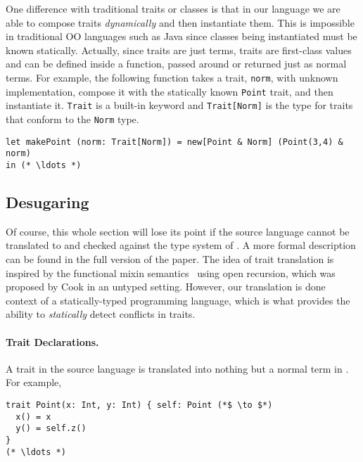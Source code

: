 One difference with traditional traits or classes is that in our language we are
able to compose traits \emph{dynamically} and then instantiate them. This is
impossible in traditional OO languages such as Java since classes being
instantiated must be known statically. Actually, since traits are just terms,
traits are first-class values and can be defined inside a function, passed
around or returned just as normal terms. For example, the following function
takes a trait, \lstinline$norm$, with unknown implementation, compose it with
the statically known \lstinline$Point$ trait, and then instantiate it.
\lstinline$Trait$ is a built-in keyword and \lstinline$Trait[Norm]$ is the type
for traits that conform to the \lstinline$Norm$ type.

\begin{lstlisting}
let makePoint (norm: Trait[Norm]) = new[Point & Norm] (Point(3,4) & norm)
in (* \ldots *)
\end{lstlisting}


\subsection{Desugaring}

Of course, this whole section will lose its point if the source language cannot
be translated to \name and checked against the type system of \name. A more
formal description can be found in the full version of the paper. The
idea of trait translation
is inspired by the functional mixin
semantics~\cite{cook1989denotational} using open recursion, which was
proposed by Cook in an untyped setting. However, our translation is done context of a
statically-typed programming language, which is what provides the ability to \emph{statically}
detect conflicts in traits.

\paragraph{Trait Declarations.} A trait in the source language is translated into
nothing but a normal term in \name. For example,

\begin{lstlisting}
trait Point(x: Int, y: Int) { self: Point (*$ \to $*)
  x() = x
  y() = self.z()
}
(* \ldots *)
\end{lstlisting}

